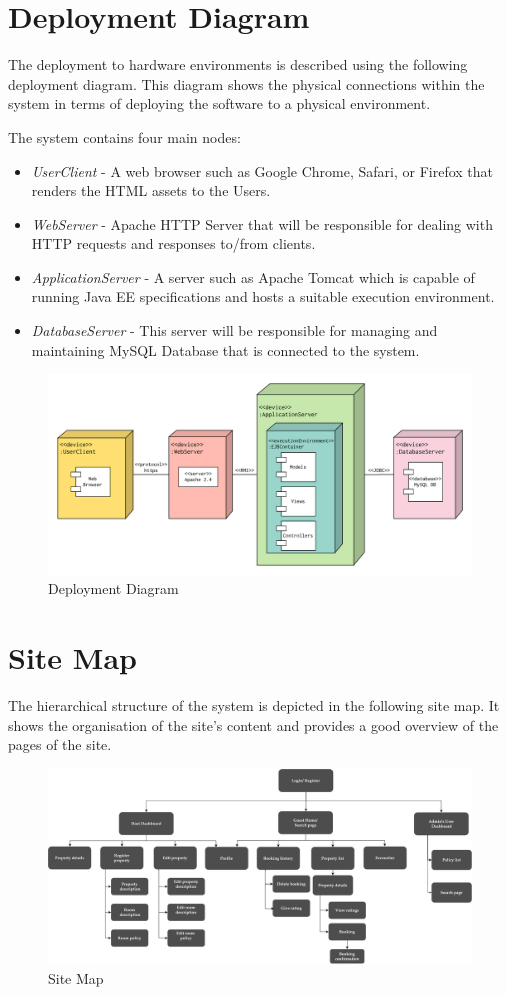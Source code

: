 \section{Deployment Diagram}
The deployment to hardware environments is described using the following deployment diagram. This diagram shows the physical connections within the system in terms of deploying the software to a physical environment.

The system contains four main nodes:
\begin{itemize}
    \item \textit{UserClient} - A web browser such as Google Chrome, Safari, or Firefox that renders the HTML assets to the Users.
    \item \textit{WebServer} - Apache HTTP Server that will be responsible for dealing with HTTP requests and responses to/from clients.
    \item \textit{ApplicationServer} - A server such as Apache Tomcat which is capable of running Java EE specifications and hosts a suitable execution environment.
    \item \textit{DatabaseServer} - This server will be responsible for managing and maintaining MySQL Database that is connected to the system.
\end{itemize}

\begin{figure}[H]
    \centering
    \includegraphics[width=17cm]{img/deployment_diagram.png}
    \caption{Deployment Diagram}
    \label{deployment_diagram}
\end{figure}

\section{Site Map}

The hierarchical structure of the system is depicted in the following site map. It shows the organisation of the site's content and provides a good overview of the pages of the site.

\begin{figure}[H]
    \centering
    \includegraphics[width=17cm]{img/site_map.pdf}
    \caption{Site Map}
    \label{site_map}
\end{figure}
